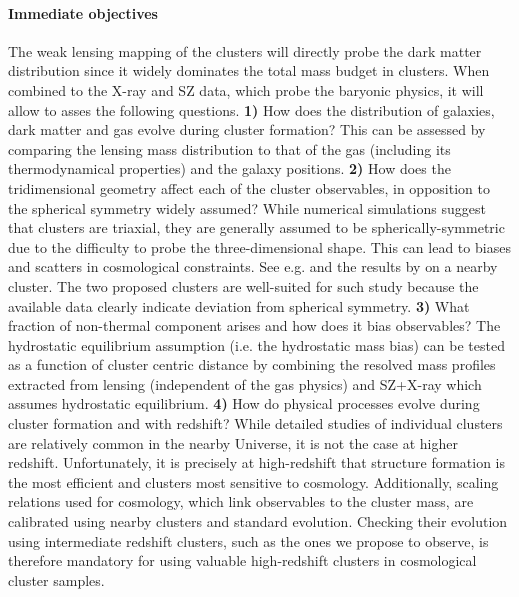 \documentclass[11pt,a4paper,twoside,graphicx,color]{article}
\begin{document}
\paragraph{\large Immediate objectives}
The weak lensing mapping of the clusters will directly probe the dark matter distribution since it widely dominates the total mass budget in clusters. When combined to the X-ray and SZ data, which probe the baryonic physics, it will allow to asses the following questions. {\bf 1)} How does the distribution of galaxies, dark matter and gas evolve during cluster formation? This can be assessed by comparing the lensing mass distribution to that of the gas (including its thermodynamical properties) and the galaxy positions. {\bf 2)} How does the tridimensional geometry affect each of the cluster observables, in opposition to the spherical symmetry widely assumed? While numerical simulations suggest that clusters are triaxial, they are generally assumed to be spherically-symmetric due to the difficulty to probe the three-dimensional shape. This can lead to biases and scatters in cosmological constraints. See e.g. \cite{limousin2013} and the results by \cite{morandi2012} on a nearby cluster. The two proposed clusters are well-suited for such study because the available data clearly indicate deviation from spherical symmetry. {\bf 3)} What fraction of non-thermal component arises and how does it bias observables? The hydrostatic equilibrium assumption (i.e. the hydrostatic mass bias) can be tested as a function of cluster centric distance by combining the resolved mass profiles extracted from lensing (independent of the gas physics) and SZ+X-ray which assumes hydrostatic equilibrium. {\bf 4)} How do physical processes evolve during cluster formation and with redshift? While detailed studies of individual clusters are relatively common in the nearby Universe, it is not the case at higher redshift. Unfortunately, it is precisely at high-redshift that structure formation is the most efficient and clusters most sensitive to cosmology. Additionally, scaling relations used for cosmology, which link observables to the cluster mass, are calibrated using nearby clusters and standard evolution. Checking their evolution using intermediate redshift clusters, such as the ones we propose to observe, is therefore mandatory for using valuable high-redshift clusters in cosmological cluster samples. 

\newpage
\end{document}
